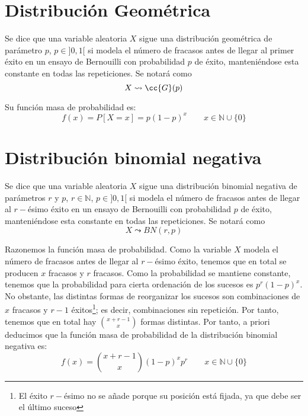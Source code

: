 \section{Distribución Geométrica}

\begin{definicion}
    Se dice que una variable aleatoria $X$ sigue una distribución geométrica de parámetro $p$, $p\in ]0,1[$ si modela el número de fracasos antes de llegar al primer éxito en un ensayo de Bernouilli con probabilidad $p$ de éxito, manteniéndose esta constante en todas las repeticiones. Se notará como $$X\leadsto \cc{G}(p)$$
\end{definicion}

Su función masa de probabilidad es:
\begin{equation*}
    f(x) = P[X=x] = p(1-p)^x \qquad x\in \mathbb{N}\cup \{0\}
\end{equation*}

\section{Distribución binomial negativa}
\begin{definicion}
    Se dice que una variable aleatoria $X$ sigue una distribución binomial negativa de parámetros $r$ y $p$, $r\in \mathbb{N}$, $p\in ]0,1[$ si modela el número de fracasos antes de llegar al $r-$ésimo éxito en un ensayo de Bernouilli con probabilidad $p$ de éxito, manteniéndose esta constante en todas las repeticiones. Se notará como $$X\leadsto BN(r,p)$$
\end{definicion}

Razonemos la función masa de probabilidad. Como la variable $X$ modela el número de fracasos antes de llegar al $r-$ésimo éxito, tenemos que en total se producen $x$ fracasos y $r$ fracasos. Como la probabilidad se mantiene constante, tenemos que la probabilidad para cierta ordenación de los sucesos es $p^r(1-p)^{x}$. No obstante, las distintas formas de reorganizar los sucesos son combinaciones de $x$ fracasos y $r-1$ éxitos\footnote{El éxito $r-$ésimo no se añade porque su posición está fijada, ya que debe ser el último suceso}; es decir, combinaciones sin repetición. Por tanto, tenemos que en total hay $\binom{x+r-1}{x}$ formas distintas. Por tanto, a priori deducimos que la función masa de probabilidad de la distribución binomial negativa es:
\begin{equation*}
    f(x) = \binom{x+r-1}{x}(1-p)^{x}p^r \qquad x\in \mathbb{N}\cup \{0\}
\end{equation*}

